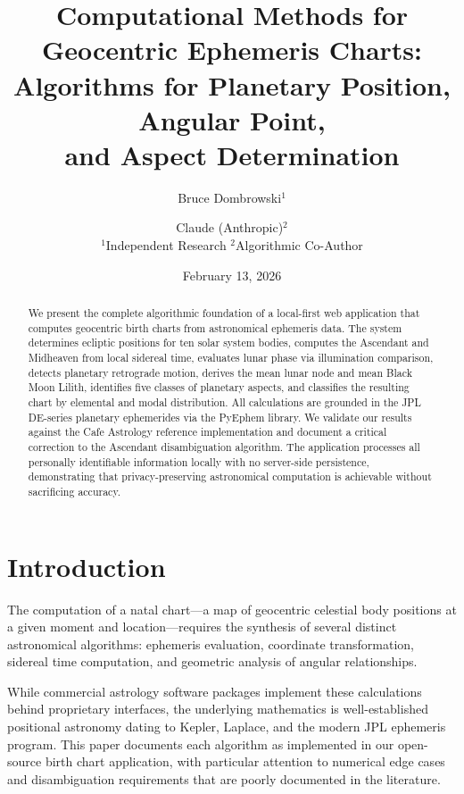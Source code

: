 \documentclass[11pt,letterpaper,twocolumn]{article}
\title{\textbf{Computational Methods for Geocentric Ephemeris Charts:\\
Algorithms for Planetary Position, Angular Point,\\
and Aspect Determination}}
\author{Bruce Dombrowski$^{1}$ \and Claude (Anthropic)$^{2}$\\
\small $^{1}$Independent Research \quad $^{2}$Algorithmic Co-Author}
\date{February 13, 2026}
\begin{document}
\maketitle

\begin{abstract}
We present the complete algorithmic foundation of a local-first web application that computes geocentric birth charts from astronomical ephemeris data. The system determines ecliptic positions for ten solar system bodies, computes the Ascendant and Midheaven from local sidereal time, evaluates lunar phase via illumination comparison, detects planetary retrograde motion, derives the mean lunar node and mean Black Moon Lilith, identifies five classes of planetary aspects, and classifies the resulting chart by elemental and modal distribution. All calculations are grounded in the JPL DE-series planetary ephemerides via the PyEphem library. We validate our results against the Cafe Astrology reference implementation and document a critical correction to the Ascendant disambiguation algorithm. The application processes all personally identifiable information locally with no server-side persistence, demonstrating that privacy-preserving astronomical computation is achievable without sacrificing accuracy.
\end{abstract}

\section{Introduction}

The computation of a natal chart---a map of geocentric celestial body positions at a given moment and location---requires the synthesis of several distinct astronomical algorithms: ephemeris evaluation, coordinate transformation, sidereal time computation, and geometric analysis of angular relationships.

While commercial astrology software packages implement these calculations behind proprietary interfaces, the underlying mathematics is well-established positional astronomy dating to Kepler, Laplace, and the modern JPL ephemeris program. This paper documents each algorithm as implemented in our open-source birth chart application, with particular attention to numerical edge cases and disambiguation requirements that are poorly documented in the literature.
\end{document}
